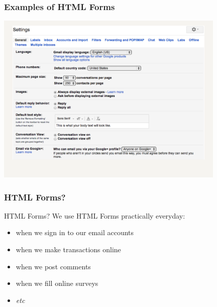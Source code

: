 \documentclass{beamer}\usepackage[]{graphicx}\usepackage[]{color}
\begin{document}

\begin{frame}[fragile]
\frametitle{Examples of HTML Forms}

\begin{center}
\includegraphics[width=11cm]{images/html_form_gmail.pdf}
\end{center}

\end{frame}


\begin{frame}[fragile]
\frametitle{HTML Forms?}

\begin{block}{HTML Forms?}
We use HTML Forms practically everyday: 
\begin{itemize}
 \item when we sign in to our email accounts
 \item when we make transactions online 
 \item when we post comments
 \item when we fill online surveys
 \item \textit{etc}
\end{itemize}
\end{block}

\end{frame}

\end{document}
